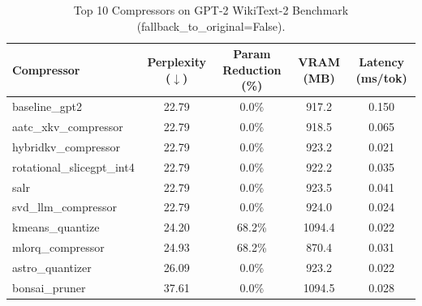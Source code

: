 \begin{table}[h]
\centering
\small
\caption{Top 10 Compressors on GPT-2 WikiText-2 Benchmark (fallback\_to\_original=False).}
\label{tab:wikitext2_pareto}
\begin{tabular}{lcccc}
\toprule
\textbf{Compressor} & \textbf{Perplexity ($\downarrow$)} & \textbf{Param Reduction (\%)} & \textbf{VRAM (MB)} & \textbf{Latency (ms/tok)} \\
\midrule
baseline\_gpt2 & 22.79 & 0.0\% & 917.2 & 0.150 \\
aatc\_xkv\_compressor & 22.79 & 0.0\% & 918.5 & 0.065 \\
hybridkv\_compressor & 22.79 & 0.0\% & 923.2 & 0.021 \\
rotational\_slicegpt\_int4 & 22.79 & 0.0\% & 922.2 & 0.035 \\
salr & 22.79 & 0.0\% & 923.5 & 0.041 \\
svd\_llm\_compressor & 22.79 & 0.0\% & 924.0 & 0.024 \\
kmeans\_quantize & 24.20 & 68.2\% & 1094.4 & 0.022 \\
mlorq\_compressor & 24.93 & 68.2\% & 870.4 & 0.031 \\
astro\_quantizer & 26.09 & 0.0\% & 923.2 & 0.022 \\
bonsai\_pruner & 37.61 & 0.0\% & 1094.5 & 0.028 \\
\bottomrule
\end{tabular}
\end{table}
